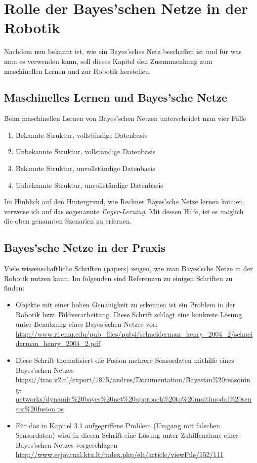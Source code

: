 \chapter{Rolle der Bayes'schen Netze in der Robotik}
Nachdem nun bekannt ist, wie ein Bayes'sches Netz beschaffen ist und für was man es verwenden kann, soll dieses Kapitel den Zusammenhang zum maschinellen Lernen und zur Robotik herstellen.
\section{Maschinelles Lernen und Bayes'sche Netze}
Beim maschinellen Lernen von Bayes'schen Netzen unterscheidet man vier Fälle \cite{Friedman}
\begin{enumerate}

\item Bekannte Struktur, vollständige Datenbasis
\item Unbekannte Struktur, vollständige Datenbasis
\item Bekannte Struktur, unvollständige Datenbasis 
\item Unbekannte Struktur, unvollständige Datenbasis
\end{enumerate}

Im Hinblick auf den Hintergrund, wie Rechner Bayes'sche Netze lernen können, verweise ich auf das sogenannte \textit{Eager-Lerning}. Mit dessen Hilfe, ist es möglich die oben genannten Szenarien zu erlernen. 

\section{Bayes'sche Netze in der Praxis}
Viele wissenschaftliche Schriften (papers) zeigen, wie man Bayes'sche Netze in der Robotik nutzen kann. Im folgenden sind Referenzen zu einigen Schriften zu finden:
\begin{itemize}
\item Objekte mit einer hohen Genauigkeit zu erkennen ist ein Problem in der Robotik bzw. Bildverarbeitung. Diese Schrift schlägt eine konkrete Lösung unter Benutzung eines Bayes'schen Netzes vor: 
\subitem \url{http://www.ri.cmu.edu/pub_files/pub4/schneiderman_henry_2004_2/schneiderman_henry_2004_2.pdf}




\item Diese Schrift thematisiert die Fusion mehrere Sensordaten mithilfe eines Bayes'schen Netzes
\subitem \url{https://trac.v2.nl/export/7875/andres/Documentation/Bayesian%20reasoning-networks/dynamic%20bayes%20net%20approach%20to%20multimodal%20sensor%20fusion.ps}


\item Für das in Kapitel 3.1 aufgegriffene Problem (Umgang mit falschen Sensordaten) wird in diesen Schrift eine Lösung unter Zuhilfenahme eines Bayes'schen Netzes vorgeschlagen
\subitem \url{http://www.eejournal.ktu.lt/index.php/elt/article/viewFile/152/111}
\end{itemize}

